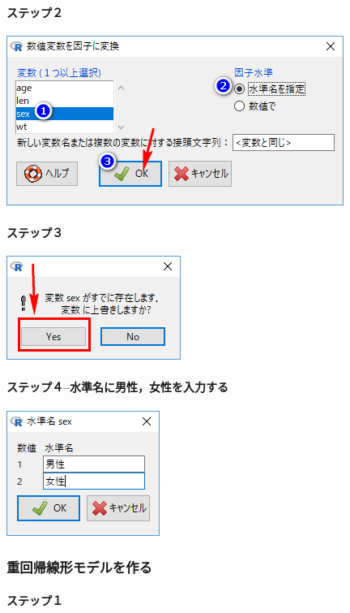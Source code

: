 \documentclass[11pt,]{problemset}
\let\oldparagraph\paragraph
\renewcommand{\paragraph}[1]{\oldparagraph{#1}\mbox{}}
\begin{document}
\hypertarget{section-19}{%
\paragraph{ステップ２}\label{section-19}}

\begin{center}\includegraphics[width=0.4\linewidth]{pic/sexfactor01} \end{center}

\hypertarget{section-20}{%
\paragraph{ステップ３}\label{section-20}}

\begin{center}\includegraphics[width=0.15\linewidth]{pic/sexfactor02} \end{center}

\hypertarget{section-21}{%
\paragraph{ステップ４--水準名に男性，女性を入力する}\label{section-21}}

\begin{center}\includegraphics[width=0.15\linewidth]{pic/sexfactor03} \end{center}

\hypertarget{section-22}{%
\subsubsection{重回帰線形モデルを作る}\label{section-22}}

\hypertarget{section-23}{%
\paragraph{ステップ１}\label{section-23}}
\end{document}
